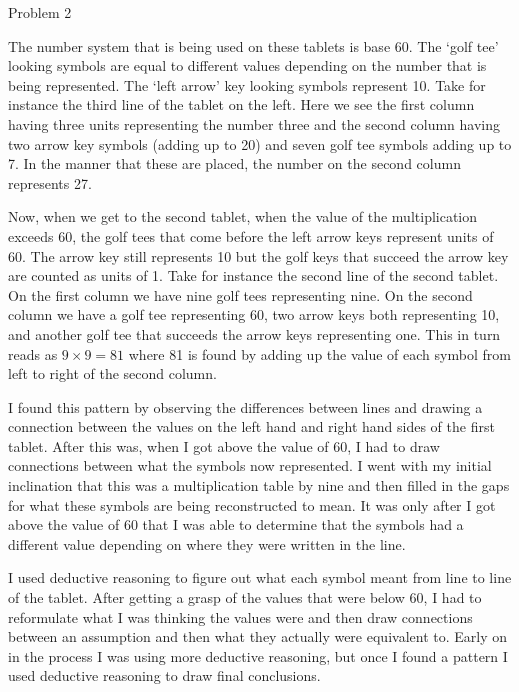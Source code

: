 \begin{problem}{Problem 2}
\begin{Highlight}[Solution]
        The number system that is being used on these tablets is base 60. The `golf tee' looking symbols are equal to different values depending on the number that is being represented. The `left arrow'
        key looking symbols represent 10. Take for instance the third line of the tablet on the left. Here we see the first column having three units representing the number three and the second column
        having two arrow key symbols (adding up to 20) and seven golf tee symbols adding up to 7. In the manner that these are placed, the number on the second column represents 27.

        Now, when we get to the second tablet, when the value of the multiplication exceeds 60, the golf tees that come before the left arrow keys represent units of 60. The arrow key still represents 10
        but the golf keys that succeed the arrow key are counted as units of 1. Take for instance the second line of the second tablet. On the first column we have nine golf tees representing nine. On the
        second column we have a golf tee representing 60, two arrow keys both representing 10, and another golf tee that succeeds the arrow keys representing one. This in turn reads as $9 \times 9 = 81$ where
        81 is found by adding up the value of each symbol from left to right of the second column.

        I found this pattern by observing the differences between lines and drawing a connection between the values on the left hand and right hand sides of the first tablet. After this was, when I got above
        the value of 60, I had to draw connections between what the symbols now represented. I went with my initial inclination that this was a multiplication table by nine and then filled in the gaps for
        what these symbols are being reconstructed to mean. It was only after I got above the value of 60 that I was able to determine that the symbols had a different value depending on where they were written
        in the line.

        I used deductive reasoning to figure out what each symbol meant from line to line of the tablet. After getting a grasp of the values that were below 60, I had to reformulate what I was thinking the values
        were and then draw connections between an assumption and then what they actually were equivalent to. Early on in the process I was using more deductive reasoning, but once I found a pattern I used deductive
        reasoning to draw final conclusions.
    \end{Highlight}
\end{problem}

